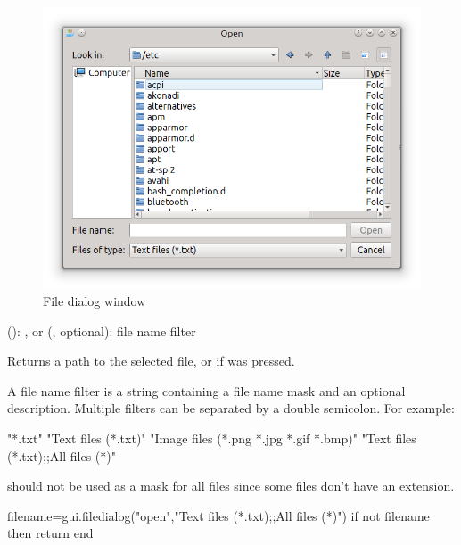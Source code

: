 \documentclass[a4paper,12pt,twoside,extrafontsizes]{memoir}
\begin{document}
\begin{figure}[htbp]
\centering
\includegraphics[scale=0.8]{images/filedialog.png}
\caption{File dialog window}
\label{fig:filedialog}
\end{figure}

\begin{funcparams}
	 (): ,  or 
	 (, optional): file name filter
\end{funcparams}

\begin{funcret}
	Returns a path to the selected file, or  if  was pressed.
\end{funcret}

\begin{funcremarks}
	A file name filter is a string containing a file name mask and an optional description. Multiple filters can be separated by a double semicolon. For example:
\begin{shellcmds}\begin{luacode}
"*.txt"
"Text files (*.txt)"
"Image files (*.png *.jpg *.gif *.bmp)"
"Text files (*.txt);;All files (*)"
\end{luacode}\end{shellcmds}
	 should not be used as a mask for all files since some files don't have an extension.
\end{funcremarks}

\begin{funcexamples}
\begin{shellcmds}\begin{luacode}
filename=gui.filedialog("open","Text files (*.txt);;All files (*)")
if not filename then return end
\end{luacode}\end{shellcmds}
\end{funcexamples}
\end{document}
